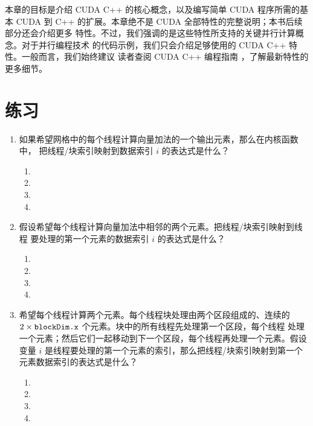 本章的目标是介绍 CUDA C++ 的核心概念，以及编写简单 CUDA 程序所需的基本 CUDA
到 C++ 的扩展。本章绝不是 CUDA 全部特性的完整说明；本书后续部分还会介绍更多
特性。不过，我们强调的是这些特性所支持的关键并行计算概念。对于并行编程技术
的代码示例，我们只会介绍足够使用的 CUDA C++ 特性。一般而言，我们始终建议
读者查阅 CUDA C++ 编程指南 \cite{cuda2025-ch2}，了解最新特性的更多细节。

\section{练习}
\label{sec:chapter-2-exercises}

\begin{enumerate}[label=\arabic*.,leftmargin=2.7em]
  \item 如果希望网格中的每个线程计算向量加法的一个输出元素，那么在内核函数中，
  把线程/块索引映射到数据索引 $i$ 的表达式是什么？
  \begin{enumerate}[label=\alph*.,leftmargin=2.2em]
    \item {}
    \item {}
    \item {}
    \item {}
  \end{enumerate}

  \item 假设希望每个线程计算向量加法中相邻的两个元素。把线程/块索引映射到线程
  要处理的第一个元素的数据索引 $i$ 的表达式是什么？
  \begin{enumerate}[label=\alph*.,leftmargin=2.2em]
    \item {}
    \item {}
    \item {}
    \item {}
  \end{enumerate}

  \item 希望每个线程计算两个元素。每个线程块处理由两个区段组成的、连续的
  $2\times\code{blockDim.x}$ 个元素。块中的所有线程先处理第一个区段，每个线程
  处理一个元素；然后它们一起移动到下一个区段，每个线程再处理一个元素。假设
  变量 $i$ 是线程要处理的第一个元素的索引，那么把线程/块索引映射到第一个
  元素数据索引的表达式是什么？
  \begin{enumerate}[label=\alph*.,leftmargin=2.2em]
    \item {}
    \item {}
    \item {}
    \item {}
  \end{enumerate}


\end{enumerate}
